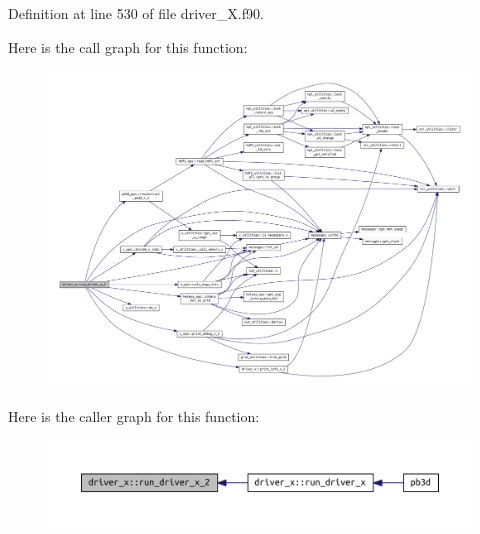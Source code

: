 Definition at line 530 of file driver\+\_\+\+X.\+f90.

Here is the call graph for this function\+:\nopagebreak
\begin{figure}[H]
\begin{center}
\leavevmode
\includegraphics[width=350pt]{namespacedriver__x_ad3924b3d66f336f0a9a9559eafffec8e_cgraph}
\end{center}
\end{figure}
Here is the caller graph for this function\+:\nopagebreak
\begin{figure}[H]
\begin{center}
\leavevmode
\includegraphics[width=350pt]{namespacedriver__x_ad3924b3d66f336f0a9a9559eafffec8e_icgraph}
\end{center}
\end{figure}
